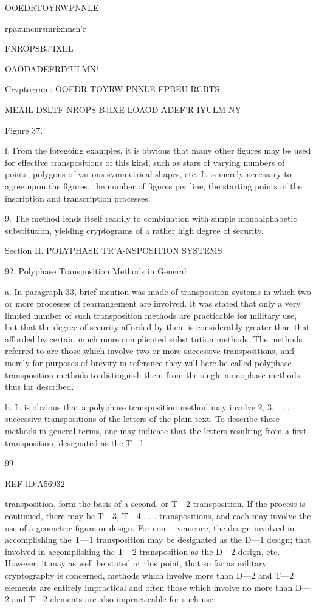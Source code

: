 {OOEDRTOYRWPNNLE

rpazuncnrsmrixnnsn'r

FNROPSBJ’IXEL

OAODADEFRIYULMN!

Cryptogram:
OOEDR TOYRW PNNLE FPBEU RCBTS

MEAIL DSLTF NROPS BJIXE LOAOD
ADEF‘R IYULM NY

Figure 37.

f. From the foregoing examples, it is obvious that many other ﬁgures
may be used for effective transpositions of this kind, such as stars
of varying numbers of points, polygons of various symmetrical shapes,
etc. It is merely necessary to agree upon the ﬁgures, the number of
ﬁgures per line, the starting points of the inscription and transcription
processes.

9. The method lends itself readily to combination with simple
monoalphabetic substitution, yielding cryptograms of a rather high
degree of security.

Section II. POLYPHASE TR'A-NSPOSITION SYSTEMS

92. Polyphase Transposition Methods in General

a. In paragraph 33, brief mention was made of transposition systems
in which two or more processes of rearrangement are involved. It was
stated that only a very limited number of such transposition methods
are practicable for military use, but that the degree of security afforded
by them is considerably greater than that afforded by certain much
more complicated substitution methods. The methods referred to are
those which involve two or more successive transpositions, and merely
for purposes of brevity in reference they will here be called polyphase
transposition methods to distinguish them from the single monophase
methods thus far described.

b. It is obvious that a polyphase transposition method may involve
2, 3, . . . successive transpositions of the letters of the plain text.
To describe these methods in general terms, one may indicate that
the letters resulting from a ﬁrst transposition, designated as the T—l

99

REF ID:A56932

transposition, form the basis of a second, or T—2 transposition. If the
process is continued, there may be T—3, T—4 . . . transpositions, and
each may involve the use of a geometric ﬁgure or design. For con—
venience, the design involved in accomplishing the T—1 transposition
may be designated as the D—1 design; that involved in accomplishing
the T—2 transposition as the D—2 design, etc. However, it may as well
be stated at this point, that so far as military cryptography is concerned,
methods which involve more than D—2 and T—2 elements are entirely
impractical and often those which involve no more than D—2 and T—2
elements are also impracticable for such use.

}
